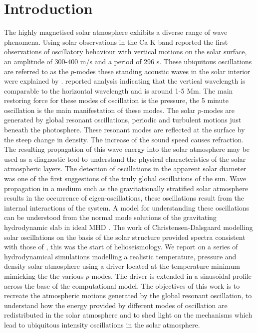 \documentclass[preprint,authoryear,12pt]{elsarticle}
\begin{document}
\section{Introduction}
The highly magnetised solar atmosphere exhibits a diverse range of wave phenomena. Using solar observations in the Ca K band \citet{Leighton1960} reported the first observations of oscillatory behaviour with  vertical motions on the solar surface, an amplitude of 300-400 m/s and a period of 296 s. These ubiquitous oscillations are referred to as the $p$-modes these standing acoustic waves in the solar interior were explained by \citet{Ulrich1970}. \citet{Leibacher1971} reported analysis indicating that the vertical wavelength is comparable to the horizontal wavelength and is around 1-5 Mm. The main restoring force for these modes of oscillation is the pressure, the 5 minute oscillation is the main manifestation of these modes. The solar $p$-modes are generated by global resonant oscillations, periodic  and turbulent motions just beneath the photosphere.  These resonant modes are reflected at the surface by the steep change in density. The increase of the sound speed causes refraction. The resulting propagation of this wave energy into the solar atmosphere may be used as a diagnostic tool to understand the physical characteristics of the  solar atmospheric layers. The detection of oscillations in the apparent solar diameter \citep[see e.g][]{Hill1976, Brown1978} was one of the first suggestions of the truly global oscillations of the sun.  Wave propagation in a medium such as the gravitationally stratified solar atmosphere results in the occurrence of eigen-oscillations, these oscillations result from the internal interactions of the system. A model for understanding these oscillations can be understood from the normal mode solutions of the gravitating  hydrodynamic slab in ideal MHD \citet{Goedbloed2004}. The work of Christensen-Dalsgaard modelling solar oscillations on the basis of the solar structure provided spectra consistent with those of \citet{Hill1976, Brown1978}, this was the start of helioseismology.  We report on a series of hydrodynamical simulations modelling a realistic temperature, pressure and density solar atmosphere using a driver located at the temperature minimum mimicking the the various $p$-modes. The driver is extended in a sinusoidal profile across the base of the computational model.  The objectives of this work is to recreate the atmospheric motions generated by the global resonant oscillation, to  understand how the energy provided by different modes of oscillation are redistributed in the solar atmosphere and to shed light on the mechanisms which lead to ubiquitous intensity oscillations in the solar atmosphere.   
\end{document}
